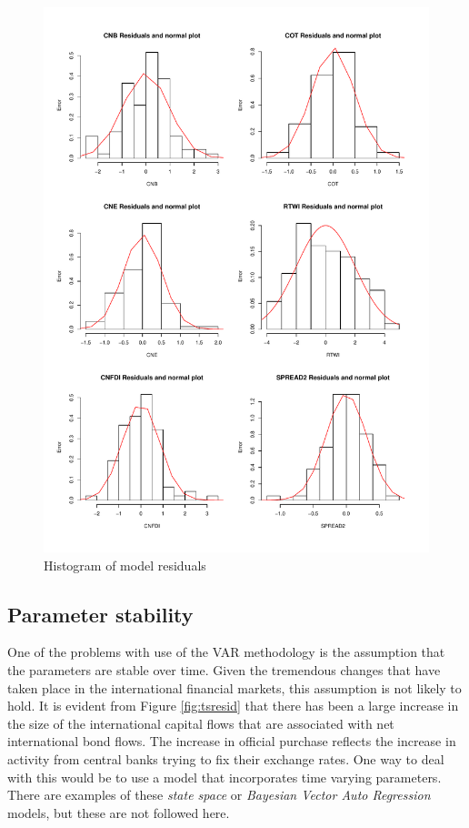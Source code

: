 \documentclass[12pt, a4paper, oneside]{article}\usepackage[]{graphicx}\usepackage[]{color}
\begin{document}
\begin{figure}[ht]
\graphicspath{{Pictures/C2/}}
\centering
\caption{Histogram of model residuals}
\label{fig:histresid}
\includegraphics[scale=0.6]{hresid}
\end{figure}   

\subsection{Parameter stability}
One of the problems with use of the VAR methodology is the assumption that the parameters are stable over time.  Given the tremendous changes that have taken place in the international financial markets, this assumption is not likely to hold.  It is evident from Figure \ref{fig:tsresid} that there has been a large increase in the size of the international capital flows that are associated with net international bond flows.  The increase in official purchase reflects the increase in activity from central banks trying to fix their exchange rates.  One way to deal with this would be to use a model that incorporates time varying parameters.  There are examples of these \emph{state space} or \emph{Bayesian Vector Auto Regression} models, but these are not followed here. 
\end{document}
